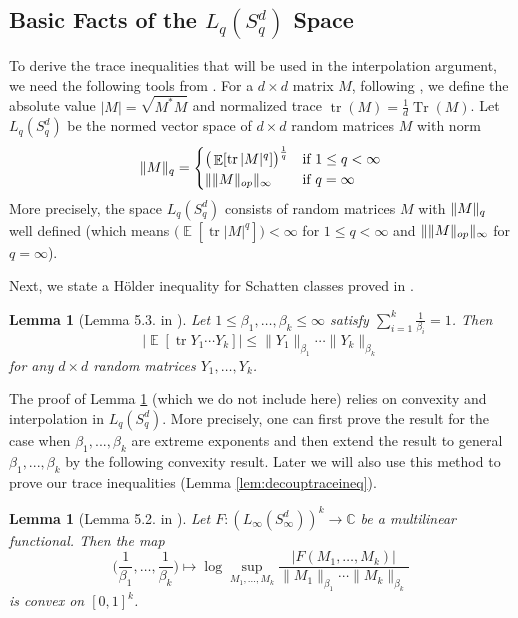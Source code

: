 \documentclass[11pt]{amsart}
\numberwithin{equation}{section}
\numberwithin{equation}{section}
\DeclareMathOperator{\E}{\mathbb{E}}
\DeclareMathOperator*{\tr}{tr}
\DeclareMathOperator*{\Tr}{Tr}
\DeclarePairedDelimiter{\norm}{\lVert}{\rVert}
\newtheorem{lemma}[theorem]{Lemma}
\theoremstyle{remark}
\theoremstyle{definition}
\begin{document}
\subsection{Basic Facts of the $L_q(S_q^d)$ Space}

To derive the trace inequalities that will be used in the interpolation argument, we need the following tools from \cite{brailovskaya2022universality}. For a $d \times d$ matrix $M$, following \cite{brailovskaya2022universality}, we define the absolute value $|M|=\sqrt{M^*M}$ and normalized trace $\tr(M)=\frac {1}{d}\Tr(M)$. Let $L_q(S_q^d)$ be the normed vector space of $d\times d$ random matrices $M$ with norm
\begin{align*}
	\norm{M}_q = \begin{cases}
	\big(\E[\tr |M|^q]\big)^{\frac{1}{q}} & \text{if }1\le q<\infty\\
	\| \norm{M}_{op} \|_\infty & \text{if }q=\infty
	\end{cases}
\end{align*}
More precisely, the space $L_q(S_q^d)$ consists of random matrices $M$ with $\norm{M}_q$ well defined (which means $\big(\E[\tr |M|^q]\big)<\infty$ for $1\le q<\infty$ and $\| \norm{M}_{op} \|_\infty$ for $q=\infty$).

Next, we state a H\"older inequality for Schatten classes proved in \cite{brailovskaya2022universality}.

\begin{lemma}[Lemma 5.3. in \cite{brailovskaya2022universality}]
\label{lem:holdervanhandel}
Let $1\le 
\beta_1,\ldots,\beta_k\le\infty$ satisfy $\sum_{i=1}^k\frac{1}{\beta_i}=1$. Then
$$
	|\E[\tr Y_1\cdots Y_k]| \le
	\|Y_1\|_{\beta_1}\cdots \|Y_k\|_{\beta_k}
$$
for any $d\times d$ random matrices $Y_1,\ldots,Y_k$.
\end{lemma}

The proof of Lemma \ref{lem:holdervanhandel} (which we do not include here) relies on convexity and interpolation in $L_q(S_q^d)$. More precisely, one can first prove the result for the case when $\beta_1,...,\beta_k$ are extreme exponents and then extend the result to general $\beta_1,...,\beta_k$ by the following convexity result. Later we will also use this method to prove our trace inequalities (Lemma \ref{lem:decouptraceineq}).

\begin{lemma}[Lemma 5.2. in \cite{brailovskaya2022universality}]
\label{lem:calderon}
Let $F:(L_\infty(S_\infty^d))^k\to\mathbb{C}$ be a multilinear functional.
Then the map
$$
	\bigg(\frac{1}{\beta_1},\ldots,\frac{1}{\beta_k}\bigg)
	\mapsto
	\log \sup_{M_1,\ldots,M_k}
	\frac{|F(M_1,\ldots,M_k)|}{\|M_1\|_{\beta_1}\cdots\|M_k\|_{\beta_k}}
$$
is convex on $[0,1]^k$.
\end{lemma}
\end{document}
